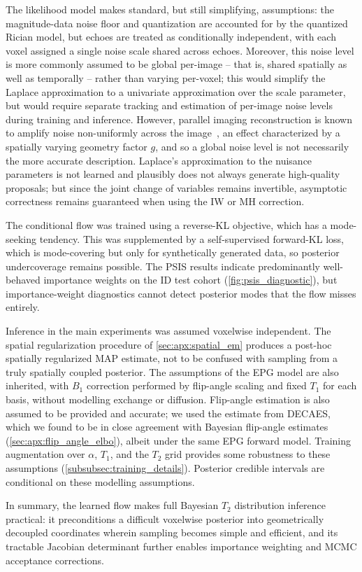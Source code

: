 The likelihood model makes standard, but still simplifying, assumptions:
the magnitude-data noise floor and quantization are accounted for by the quantized Rician model, but echoes are treated as conditionally independent, with each voxel assigned a single noise scale shared across echoes.
Moreover, this noise level is more commonly assumed to be global per-image -- that is, shared spatially as well as temporally -- rather than varying per-voxel;
this would simplify the Laplace approximation to a univariate approximation over the scale parameter, but would require separate tracking and estimation of per-image noise levels during training and inference.
However, parallel imaging reconstruction is known to amplify noise non-uniformly across the image~\citep{pruessmann_sense_1999,robson_comprehensive_2008,aja-fernandez_noise_2014}, an effect characterized by a spatially varying geometry factor $g$, and so a global noise level is not necessarily the more accurate description.
Laplace's approximation to the nuisance parameters is not learned and plausibly does not always generate high-quality proposals;
but since the joint change of variables remains invertible, asymptotic correctness remains guaranteed when using the \gls*{IW} or \gls*{MH} correction.

The conditional flow was trained using a reverse-\gls*{KL} objective, which has a mode-seeking tendency.
This was supplemented by a self-supervised forward-\gls*{KL} loss, which is mode-covering but only for synthetically generated data, so posterior undercoverage remains possible.
The \gls*{PSIS} results indicate predominantly well-behaved importance weights on the ID test cohort (\cref{fig:psis_diagnostic}), but importance-weight diagnostics cannot detect posterior modes that the flow misses entirely.

Inference in the main experiments was assumed voxelwise independent.
The spatial regularization procedure of \cref{sec:apx:spatial_em} produces a post-hoc spatially regularized \gls*{MAP} estimate, not to be confused with sampling from a truly spatially coupled posterior.
The assumptions of the \gls*{EPG} model are also inherited, with $B_1$ correction performed by flip-angle scaling and fixed $T_1$ for each basis, without modelling exchange or diffusion.
Flip-angle estimation is also assumed to be provided and accurate;
we used the estimate from \gls*{DECAES}, which we found to be in close agreement with Bayesian flip-angle estimates (\cref{sec:apx:flip_angle_elbo}), albeit under the same \gls*{EPG} forward model.
Training augmentation over $\alpha$, $T_1$, and the $T_2$ grid provides some robustness to these assumptions (\cref{subsubsec:training_details}).
Posterior credible intervals are conditional on these modelling assumptions.

In summary, the learned flow makes full Bayesian $T_2$ distribution inference practical:
it preconditions a difficult voxelwise posterior into geometrically decoupled coordinates wherein sampling becomes simple and efficient, and its tractable Jacobian determinant further enables importance weighting and \gls*{MCMC} acceptance corrections.
